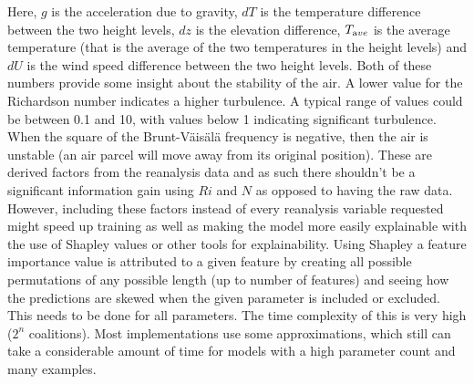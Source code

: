 Here, $g$ is the acceleration due to gravity, $dT$ is the temperature difference between the two height levels, $dz$ is the elevation difference, $T_{\textrm ave}$ is the average temperature (that is the average of the two temperatures in the height levels) and $dU$ is the wind speed difference between the two height levels. Both of these numbers provide some insight about the stability of the air. A lower value for the Richardson number indicates a higher turbulence. A typical range of values could be between 0.1 and 10, with values below 1 indicating significant turbulence\cite{richardson_number_skybrary}. When the square of the Brunt-Väisälä frequency is negative, then the air is unstable (an air parcel will move away from its original position)\cite{brunt_vaisala_freq_eumtrain}. These are derived factors from the reanalysis data and as such there shouldn't be a significant information gain using $Ri$ and $N$ as opposed to having the raw data. However, including these factors instead of every reanalysis variable requested might speed up training as well as making the model more easily explainable with the use of Shapley values or other tools for explainability. Using Shapley a feature importance value is attributed to a given feature by creating all possible permutations of any possible length (up to number of features) and seeing how the predictions are skewed when the given parameter is included or excluded. This   needs to be done for all parameters. The time complexity of this is very high ($2^n$ coalitions)\cite{shapley_information}. Most implementations use some approximations, which still can take a considerable amount of time for models with a high parameter count and many examples.

